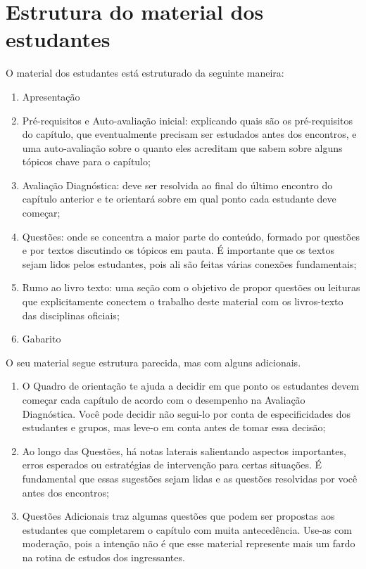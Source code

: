 \section{Estrutura do material dos estudantes}

O material dos estudantes está estruturado da seguinte maneira:

\begin{enumerate}
 \item Apresentação
 \item Pré-requisitos e Auto-avaliação inicial: explicando quais são os pré-requisitos do capítulo, que eventualmente precisam ser estudados antes dos encontros, e uma auto-avaliação sobre o quanto eles acreditam que sabem sobre alguns tópicos chave para o capítulo;
 \item Avaliação Diagnóstica: deve ser resolvida ao final do último encontro do capítulo anterior e te orientará sobre em qual ponto cada estudante deve começar;
 \item Questões: onde se concentra a maior parte do conteúdo, formado por questões e por textos discutindo os tópicos em pauta. É importante que os textos sejam lidos pelos estudantes, pois ali são feitas várias conexões fundamentais;
 \item Rumo ao livro texto: uma seção com o objetivo de propor questões ou leituras que explicitamente conectem o trabalho deste material com os livros-texto das disciplinas oficiais;
 \item Gabarito
\end{enumerate}

O seu material segue estrutura parecida, mas com alguns adicionais.

\begin{enumerate}
 \item O Quadro de orientação te ajuda a decidir em que ponto os estudantes devem começar cada capítulo de acordo com o desempenho na Avaliação Diagnóstica. Você pode decidir não segui-lo por conta de especificidades dos estudantes e grupos, mas leve-o em conta antes de tomar essa decisão;
 \item Ao longo das Questões, há notas laterais salientando aspectos importantes, erros esperados ou estratégias de intervenção para certas situações. É fundamental que essas sugestões sejam lidas e as questões resolvidas por você antes dos encontros;
 \item Questões Adicionais traz algumas questões que podem ser propostas aos estudantes que completarem o capítulo com muita antecedência. Use-as com moderação, pois a intenção não é que esse material represente mais um fardo na rotina de estudos dos ingressantes.
\end{enumerate}

